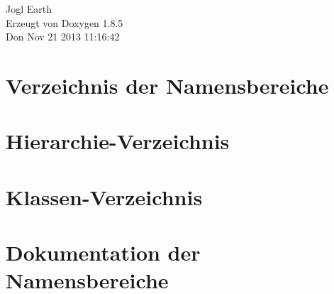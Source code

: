 \documentclass[twoside]{book}
\newcommand{\clearemptydoublepage}{%
  \newpage{\pagestyle{empty}\cleardoublepage}%
}
\begin{document}
\begin{titlepage}
\vspace*{7cm}
\begin{center}%
{\Large Jogl Earth }\\
\vspace*{1cm}
{\large Erzeugt von Doxygen 1.8.5}\\
\vspace*{0.5cm}
{\small Don Nov 21 2013 11:16:42}\\
\end{center}
\end{titlepage}
\clearemptydoublepage
\tableofcontents
\clearemptydoublepage
{}

\chapter{Verzeichnis der Namensbereiche}

\chapter{Hierarchie-\/\-Verzeichnis}

\chapter{Klassen-\/\-Verzeichnis}

\chapter{Dokumentation der Namensbereiche}


\end{document}
